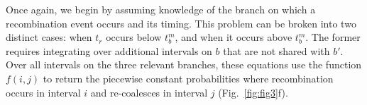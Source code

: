 \documentclass[11pt]{article}
\begin{document}
Once again, we begin by assuming knowledge of the branch on which a 
recombination event occurs and its timing. This problem can be broken 
into two distinct cases: when $t_r$ occurs below $t_b^m$, and when it 
occurs above $t_b^m$. The former requires integrating over additional 
intervals on $b$ that are not shared with $b'$. Over all intervals
on the three relevant branches, these equations use the function 
$f(i,j)$ to return the piecewise constant probabilities where recombination 
occurs in interval $i$ and re-coalesces in interval $j$ (Fig.~\ref{fig:fig3}f).









\end{document}
